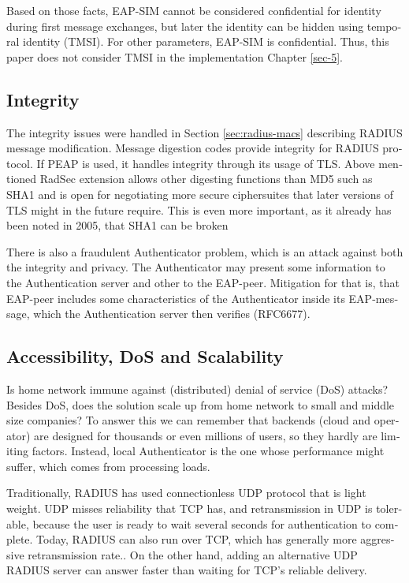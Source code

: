 \documentclass[12pt,a4paper,english]{tutthesis}
\begin{document}
\begin{otherlanguage}{english}
Based on those facts, EAP-SIM cannot be considered confidential for identity
during first message exchanges, but later the identity can be hidden
using temporal identity (TMSI). 
For other parameters, EAP-SIM is confidential.
Thus, this paper does not consider TMSI in the implementation Chapter
\ref{sec-5}.
\subsection{Integrity}
\label{sec-6-4-2}
The integrity issues were handled in Section \ref{sec:radius-macs} describing
RADIUS message modification.
Message digestion codes provide integrity for RADIUS protocol.
If PEAP is used, it handles integrity through its usage of
 TLS\cite{peap}.
Above mentioned RadSec extension allows other digesting functions than MD5 such
as SHA1 and is open for negotiating more secure ciphersuites that later
versions of TLS might in the future require\cite{rfc6614}. This is
even more important, as it already has been noted in 2005, that SHA1 can be
broken

There is also a fraudulent Authenticator problem, which is an attack
against both the integrity and privacy.  The Authenticator may present
some information to the Authentication server and other to the
EAP-peer. Mitigation for that is, that EAP-peer includes some
characteristics of the Authenticator inside its EAP-message, which
the Authentication server then verifies (RFC6677)\cite{rfc6677}.

\subsection{Accessibility, DoS and Scalability}
\label{sec-6-4-3}

Is home network immune against (distributed) denial of service (DoS)
attacks? Besides DoS, does the solution scale up from home network to
small and middle size companies?
To answer this we can remember that backends (cloud and operator) are
designed for thousands or even millions of users, so 
they hardly are limiting factors. Instead, local
Authenticator is the one whose performance might suffer, which
comes from processing loads\cite{2009-lin-simefficiency}.


Traditionally, RADIUS has used connection\-less UDP protocol that is
light weight. UDP misses reliability that TCP has, and retransmission in UDP is
tolerable, because the user is ready to wait  several seconds for
authentication to complete. Today, RADIUS can also run over TCP, which
has generally more aggressive retransmission
rate.\cite[Section 2.2.1]{rfc5080}. 
On the other hand, adding an
alternative UDP RADIUS server can answer faster than waiting for TCP's reliable delivery.



\end{otherlanguage}
\end{document}
